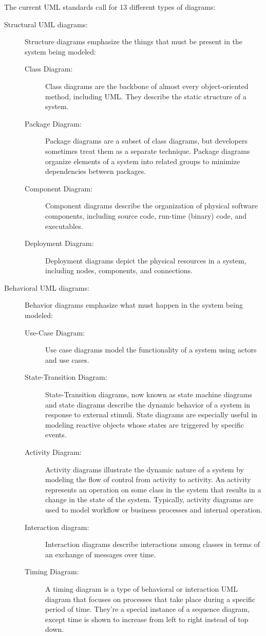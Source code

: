 \newpage
The current UML standards call for 13 different types of diagrams:
\begin{description}
\item[Structural UML diagrams:] Structure diagrams emphasize the things that
must be present in the system being modeled:
  \begin{description}
  \item[Class Diagram:] Class diagrams are the backbone of almost
  every object-oriented method, including UML. They describe the
  static structure of a system.
  \item[Package Diagram:] Package diagrams are a subset of class
  diagrams, but developers sometimes treat them as a separate
  technique. Package diagrams organize elements of a system into
  related groups to minimize dependencies between packages.
  \item[Component Diagram:] Component diagrams describe the
  organization of physical software components, including
  source code, run-time (binary) code, and executables.
  \item[Deployment Diagram:] Deployment diagrams depict
  the physical resources in a system, including nodes,
  components, and connections.
  \end{description}
\item[Behavioral UML diagrams:] Behavior diagrams emphasize what must
happen in the system being modeled:
  \begin{description}
  \item[Use-Case Diagram:] Use case diagrams model the functionality
  of a system using actors and use cases.
  \item[State-Transition Diagram:] State-Transition diagrams,
  now known as state machine diagrams and state diagrams describe
  the dynamic behavior of a system in response to external stimuli.
  State diagrams are especially useful in modeling reactive objects
  whose states are triggered by specific events.
  \item[Activity Diagram:] Activity diagrams illustrate the dynamic
  nature of a system by modeling the flow of control from activity
  to activity. An activity represents an operation on some class in
  the system that results in a change in the state of the system.
  Typically, activity diagrams are used to model workflow or business
  processes and internal operation.
  \item[Interaction diagram:] Interaction diagrams describe interactions
  among classes in terms
  of an exchange of messages over time.
  \item[Timing Diagram:] A timing diagram is a type of behavioral or
  interaction UML diagram that focuses on processes that take place
  during a specific period of time. They're a special instance of a
  sequence diagram, except time is shown to increase from left to right
  instead of top down.
  \end{description}
\end{description}
